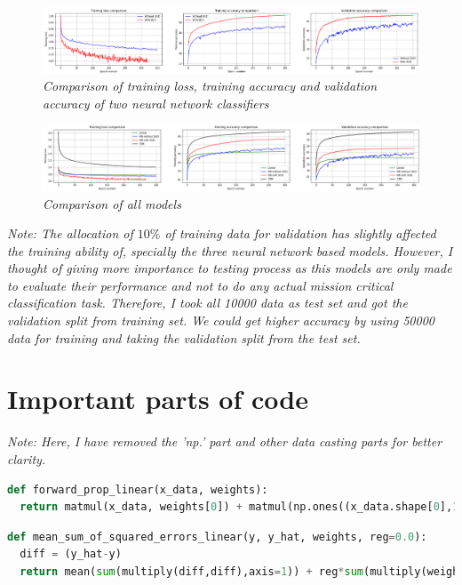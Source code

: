 \documentclass[10pt, a4paper, twocolumn]{article}
\begin{document}
\onecolumn
\begin{figure}
  \centering
	\includegraphics[width=\textwidth]{./images/nn1vs2.png}
	\caption{\textit{Comparison of training loss, training accuracy and validation accuracy of two neural network classifiers}}
	\label{fig:nn1v2}
\end{figure}
\begin{figure}
  \centering
	\includegraphics[width=\textwidth]{./images/compareAll.png}
	\caption{\textit{Comparison of all models}}
	\label{fig:comp}
\end{figure}
\textit{Note: The allocation of $10\%$ of training data for validation has slightly affected the training ability of, specially the three neural network based models. However, I thought of giving more importance to testing process as this models are only made to evaluate their performance and not to do any actual mission critical classification task. Therefore, I took all 10000 data as test set and got the validation split from training set. We could get higher accuracy by using 50000 data for training and taking the validation split from the test set.}

\section*{Important parts of code}
\textit{Note: Here, I have removed the 'np.' part and other data casting parts for better clarity.}
\begin{lstlisting}[frame=single,language=python,caption=Forward propagation function for linear classifier]
def forward_prop_linear(x_data, weights):
  return matmul(x_data, weights[0]) + matmul(np.ones((x_data.shape[0],1)),weights[1])
\end{lstlisting}

\begin{lstlisting}[frame=single,language=python,caption=Loss function for linear classifier]
def mean_sum_of_squared_errors_linear(y, y_hat, weights, reg=0.0):
  diff = (y_hat-y)
  return mean(sum(multiply(diff,diff),axis=1)) + reg*sum(multiply(weights[0],weights[0]))
\end{lstlisting}
\end{document}
